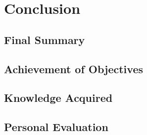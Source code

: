 \chapter{Conclusion}
\label{chap:conclusion}

\section{Final Summary}

\section{Achievement of Objectives}

\section{Knowledge Acquired}

\section{Personal Evaluation}
